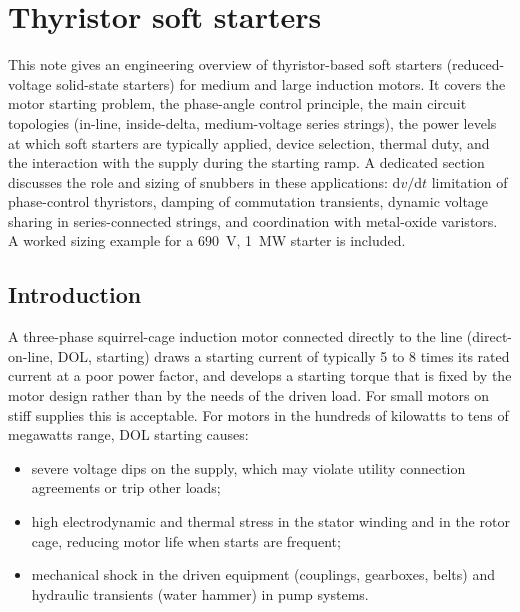 \chapter{Thyristor soft starters}
\label{ch:softstart}
\begin{chapabstract}
This note gives an engineering overview of thyristor-based soft starters
(reduced-voltage solid-state starters) for medium and large induction motors.
It covers the motor starting problem, the phase-angle control principle,
the main circuit topologies (in-line, inside-delta, medium-voltage series
strings), the power levels at which soft starters are typically applied,
device selection, thermal duty, and the interaction with the supply during
the starting ramp. A dedicated section discusses the role and sizing of
snubbers in these applications: $\mathrm{d}v/\mathrm{d}t$ limitation of
phase-control thyristors, damping of commutation transients, dynamic voltage
sharing in series-connected strings, and coordination with metal-oxide
varistors. A worked sizing example for a \SI{690}{\volt}, \SI{1}{\mega\watt}
starter is included.
\end{chapabstract}

\section{Introduction}

A three-phase squirrel-cage induction motor connected directly to the line
(direct-on-line, DOL, starting) draws a starting current of typically 5 to 8
times its rated current at a poor power factor, and develops a starting
torque that is fixed by the motor design rather than by the needs of the
driven load. For small motors on stiff supplies this is acceptable. For
motors in the hundreds of kilowatts to tens of megawatts range, DOL starting
causes:

\begin{itemize}
  \item severe voltage dips on the supply, which may violate utility
        connection agreements or trip other loads;
  \item high electrodynamic and thermal stress in the stator winding and in
        the rotor cage, reducing motor life when starts are frequent;
  \item mechanical shock in the driven equipment (couplings, gearboxes,
        belts) and hydraulic transients (water hammer) in pump systems.
\end{itemize}

